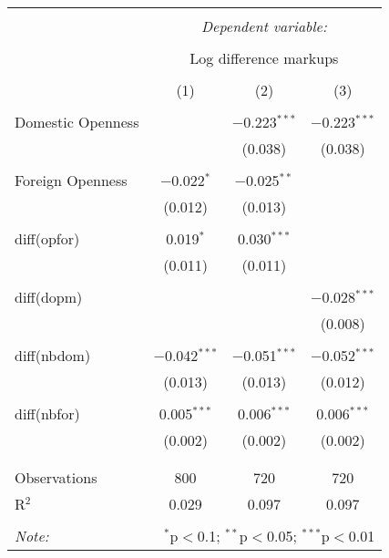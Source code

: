 
\begin{tabular}{@{\extracolsep{5pt}}lccc} 
\\[-1.8ex]\hline 
\hline \\[-1.8ex] 
 & \multicolumn{3}{c}{\textit{Dependent variable:}} \\ 
\cline{2-4} 
\\[-1.8ex] & \multicolumn{3}{c}{Log difference markups} \\ 
\\[-1.8ex] & (1) & (2) & (3)\\ 
\hline \\[-1.8ex] 
 Domestic Openness &  & $-$0.223$^{***}$ & $-$0.223$^{***}$ \\ 
  &  & (0.038) & (0.038) \\ 
  & & & \\ 
 Foreign Openness & $-$0.022$^{*}$ & $-$0.025$^{**}$ &  \\ 
  & (0.012) & (0.013) &  \\ 
  & & & \\ 
 diff(opfor) & 0.019$^{*}$ & 0.030$^{***}$ &  \\ 
  & (0.011) & (0.011) &  \\ 
  & & & \\ 
 diff(dopm) &  &  & $-$0.028$^{***}$ \\ 
  &  &  & (0.008) \\ 
  & & & \\ 
 diff(nbdom) & $-$0.042$^{***}$ & $-$0.051$^{***}$ & $-$0.052$^{***}$ \\ 
  & (0.013) & (0.013) & (0.012) \\ 
  & & & \\ 
 diff(nbfor) & 0.005$^{***}$ & 0.006$^{***}$ & 0.006$^{***}$ \\ 
  & (0.002) & (0.002) & (0.002) \\ 
  & & & \\ 
\hline \\[-1.8ex] 
Observations & 800 & 720 & 720 \\ 
R$^{2}$ & 0.029 & 0.097 & 0.097 \\ 
\hline 
\hline \\[-1.8ex] 
\textit{Note:}  & \multicolumn{3}{r}{$^{*}$p$<$0.1; $^{**}$p$<$0.05; $^{***}$p$<$0.01} \\ 
\end{tabular} 
